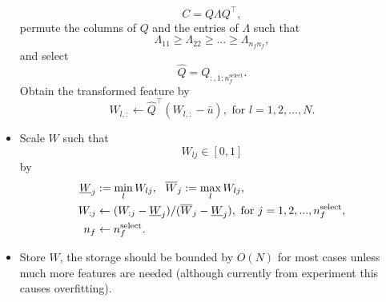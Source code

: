 \documentclass[12pt]{article}
\begin{document}
\begin{itemize}
		\begin{equation}
			C = Q\Lambda Q^\top,
		\end{equation}
		permute the columns of $Q$ and the entries of $\Lambda$ such that
		\begin{equation}
			\Lambda_{11} \geq \Lambda_{22} \geq  ... \geq \Lambda_{n_fn_f},
		\end{equation}
		and select
		\begin{equation}
			\hat{Q} = Q_{:, 1:n^\text{select}_f}.
		\end{equation}
		Obtain the transformed feature by
		\begin{equation}
			\label{eq:pca_mol_end}
			W_{l,:} \leftarrow \hat{Q}^\top(W_{l,:} - \bar{u}), \text{ for }l = 1,2,...,N.
		\end{equation}
	\item Scale $W$ such that 
	\begin{equation}
		\label{eq:scale_mol_1}
		W_{lj} \in [0, 1]
	\end{equation}
	by
	\begin{equation}
		\label{eq:scale_mol_2}
		\begin{split}
			\underbar{$W$}_{j} &:= \min_{l} W_{lj}, ~~ \overline{W}_{j} := \max_{l} W_{lj}, \\
			W_{:j} &\leftarrow (W_{:j} - \underbar{$W$}_{j})/ (\overline{W}_{j} - \underbar{$W$}_{j}), \text{ for } j = 1,2,..., n^\text{select}_f, \\
			n_f &\leftarrow n^\text{select}_f.
		\end{split}
	\end{equation}
	\item Store $W$, the storage should be bounded by $O(N)$ for most cases unless much more features are needed (although currently from experiment this causes overfitting).
\end{itemize}
\end{document}
